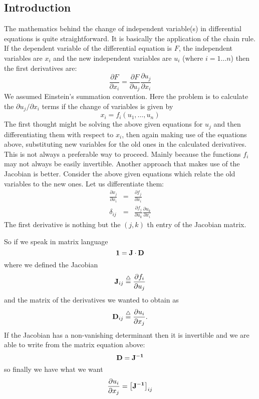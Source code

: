 
\newcommand{\definedas}{\stackrel{\triangle}{=}}

\newcommand{\changevareg}[1]{\begin{quote}{\tt #1} \end{quote}}


\subsection{Introduction}
The mathematics behind the change of independent variable(s) in differential
equations is quite straightforward. It is basically the application of the
chain rule. If the dependent variable of the differential equation is $F$,
the independent variables are $x_{i}$ and the new independent variables are
$u_{i}$ (where ${\scriptstyle i=1\ldots n}$) then the first derivatives are:
\[
    \frac{\partial F}{\partial x_{i}} = \frac{\partial F}{\partial u_{j}}
                                        \frac{\partial u_{j}}{\partial x_{i}}
\]
We assumed Einstein's summation convention. Here the problem is to
calculate the $\partial u_{j}/\partial x_{i}$ terms if the change of variables
is given by
\[
    x_{i} = f_{i}(u_{1},\ldots,u_{n})
\]
The first thought might be solving the above given equations for $u_{j}$ and
then differentiating them with respect to $x_{i}$, then again making use of the
equations above, substituting new variables for the old ones in the calculated
derivatives. This is not always a  preferable way to proceed. Mainly because
the functions $f_{i}$ may not always be easily invertible. Another approach
that makes use of the Jacobian is better. Consider the above given equations
which relate the old variables to the new ones. Let us differentiate them:
\begin{eqnarray*}
  \frac{\partial x_{j}}{\partial x_{i}} & = &
        \frac{\partial f_{j}}{\partial x_{i}}   \\
  \delta_{ij} & = &
        \frac{\partial f_{j}}{\partial u_{k}}
        \frac{\partial u_{k}}{\partial x_{i}}
\end{eqnarray*}
The first derivative is nothing but the $(j,k)$ th entry of the Jacobian matrix.

So if we speak in matrix language
\[ {\bf 1 = J \cdot D} \]
where we defined the Jacobian
\[ {\bf J}_{ij} \definedas  \frac{\partial f_{i}}{\partial u_{j}} \]
and the matrix of the derivatives we wanted to obtain as
\[ {\bf D}_{ij} \definedas  \frac{\partial u_{i}}{\partial x_{j}}. \]
If the Jacobian has a non-vanishing determinant then it is invertible and
we are able to write from the matrix equation above:
\[ {\bf  D = J^{-1}} \]
so finally we have what we want
\[
   \frac{\partial u_{i}}{\partial x_{j}} = \left[{\bf J^{-1}}\right]_{ij}
\]

